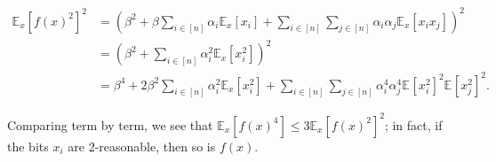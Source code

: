 \documentclass[12pt]{article}
\newcommand{\E}[2][]{\mathbb E_{#1}\left[#2\right]}
\newcommand{\sumi}{\sum_{i \in [n]}}
\newcommand{\sumj}{\sum_{j \in [n]}}
\begin{document}
\begin{align*}
    \E[x]{f(x)^2}^2 &= \left(\beta^2 + \beta \sumi \alpha_i \E[x]{x_i} + \sumi \sumj \alpha_i \alpha_j \E[x]{x_i x_j}\right)^2\\
    &= \left(\beta^2 + \sumi \alpha_i^2 \E[x]{x_i^2}\right)^2\\
    &= \beta^4 + 2\beta^2 \sumi \alpha_i^2 \E[x]{x_i^2} + \sumi \sumj \alpha_i^4 \alpha_j^4 \E{x_i^2}^2 \E{x_j^2}^2.
\end{align*}

Comparing term by term, we see that $\E[x]{f(x)^4} \leq 3 \E[x]{f(x)^2}^2$; in fact, if the bits $x_i$ are 2-reasonable, then so is $f(x)$.

\subsection{}
\end{document}
